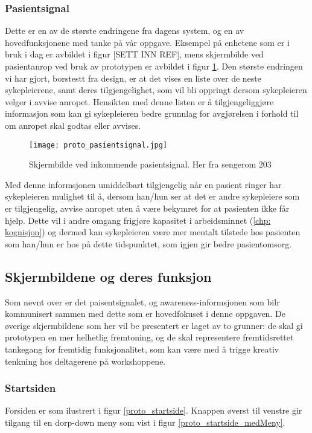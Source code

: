 \subsubsection{Pasientsignal}
Dette er en av de største endringene fra dagens system, og en av hovedfunksjonene med tanke på vår oppgave. Eksempel på enhetene som er i bruk i dag er avbildet i figur [SETT INN REF], mens skjermbilde ved pasientanrop ved bruk av prototypen er avbildet i figur \ref{protoPasientsignal}. Den største endringen vi har gjort, borstestt fra design, er at det vises en liste over de neste sykepleierene, samt deres tilgjengelighet, som vil bli oppringt dersom sykepleieren velger i avvise anropet. Hensikten med denne listen er å tilgjengeliggjøre informasjon som kan gi sykepleieren bedre grunnlag for avgjørelsen i forhold til om anropet skal godtas eller avvises.

\begin{figure}[H]
\centering
\texttt{[image: proto\_pasientsignal.jpg]}
\caption{Skjermbilde ved inkommende pasientsignal. Her fra sengerom 203}
\label{protoPasientsignal}
\end{figure}

Med denne informsjonen umiddelbart tilgjengelig når en pasient ringer har sykepleieren mulighet til å, dersom han/hun ser at det er andre sykepleiere som er tilgjengelig, avvise anropet uten å være bekymret for at pasienten ikke får hjelp. Dette vil i andre omgang frigjøre kapasitet i arbeidsminnet (\ref{chp: kognisjon}) og dermed kan sykepleieren være mer mentalt tilstede hos pasienten som han/hun er hos på dette tidspunktet, som igjen gir bedre pasientomsorg.

\subsection{Skjermbildene og deres funksjon}

Som nevnt over er det paisentsignalet, og awareness-informsjonen som bilr kommunisert sammen med dette som er hovedfokuset i denne oppgaven. De øverige skjermbildene som her vil be presentert er laget av to grunner: de skal gi prototypen en mer helhetlig fremtoning, og de skal representere fremtidsrettet tankegang for fremtidig funksjonalitet, som kan være med å trigge kreativ tenkning hos deltagerene på workshoppene.

\subsubsection{Startsiden}
Forsiden er som ilustrert i figur \ref{proto_startside}. Knappen øverst til venstre gir tilgang til en dorp-down meny som vist i figur \ref{proto_startside_medMeny}. 

